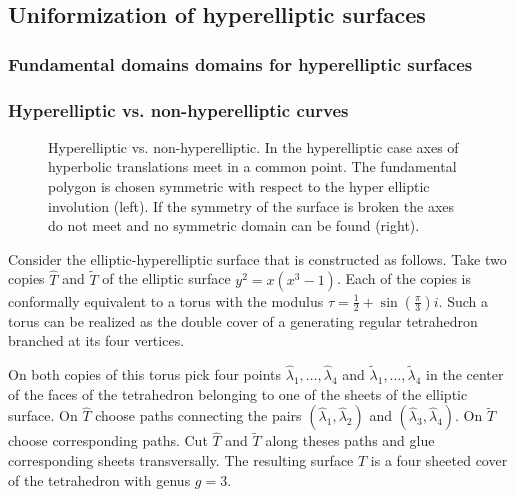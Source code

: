 \documentclass[Thesis]{subfiles}
\begin{document}
\subsection{Uniformization of hyperelliptic surfaces}
\label{sec:hyperelliptic}



\subsubsection{Fundamental domains domains for hyperelliptic surfaces}
\label{sec:hyperelliptic_domain}


\subsubsection{Hyperelliptic vs. non-hyperelliptic curves}
\label{sec:non-hyperelliptic}

\begin{figure}
\centering
{}
\caption{Hyperelliptic vs. non-hyperelliptic. In the hyperelliptic case axes of hyperbolic translations meet in a common point. The fundamental polygon is chosen symmetric with respect to the hyper elliptic involution (left). If the symmetry of the surface is broken the axes do not meet and no symmetric domain can be found (right).}
\label{fig:non-hyperelliptic}
\end{figure}

Consider the elliptic-hyperelliptic surface that is constructed as follows. Take two copies $\hat T$ and $\tilde T$ of the elliptic surface $y^2=x(x^3 - 1)$. Each of the copies is conformally equivalent to a torus with the modulus $\tau=\frac{1}{2}+\sin(\frac{\pi}{3})i$. Such a torus can be realized as the double cover of a generating regular tetrahedron branched at its four vertices.

On both copies of this torus pick four points $\hat\lambda_1,\ldots,\hat\lambda_4$ and $\tilde\lambda_1,\ldots,\tilde\lambda_4$ in the center of the faces of the tetrahedron belonging to one of the sheets of the elliptic surface. On $\hat T$ choose paths connecting the pairs $(\hat\lambda_1,\hat\lambda_2)$ and $(\hat\lambda_3,\hat\lambda_4)$. On $\tilde T$ choose corresponding paths. Cut $\hat T$ and $\tilde T$ along theses paths and glue corresponding sheets transversally. The resulting surface $T$ is a four sheeted cover of the tetrahedron with genus $g = 3$.
\end{document}
